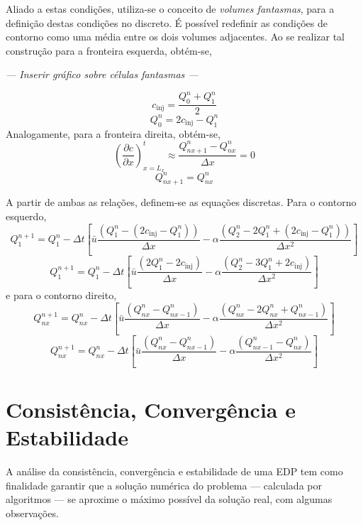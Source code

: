 Aliado a estas condições, utiliza-se o conceito de \emph{volumes fantasmas},
para a definição destas condições no discreto. É possível redefinir as
condições de contorno como uma média entre os dois volumes adjacentes. Ao se
realizar tal construção para a fronteira esquerda, obtém-se,
\begin{center}
    \textit{--- Inserir gráfico sobre células fantasmas ---}
\end{center}
\[
    c_{\text{inj}} = \frac{Q_0^n + Q_1^n}{2}
\]
\begin{equation}\label{cont. esq}
    Q_0^n = 2c_{\text{inj}} - Q_1^n
\end{equation}
Analogamente, para a fronteira direita, obtém-se,
\[
  \left(\frac{\partial c}{\partial x}\right)_{x=L_x}^t
  \approx
  \frac{Q_{nx+1}^n - Q_{nx}^n}{\Delta x} = 0
\]
\begin{equation}\label{cont. dir}
    Q_{nx+1}^n = Q_{nx}^n
\end{equation}

A partir de ambas as relações, definem-se as equações discretas. Para o contorno
esquerdo,
\[
    Q_1^{n+1} = Q_1^n - \Delta t
    \left[
    \bar{u}\frac{(Q_1^n - (2c_{\text{inj}} - Q_1^n))}{\Delta x}
    -
    \alpha\frac{(Q_2^n - 2Q_1^n + (2c_{\text{inj}} - Q_1^n))}{\Delta x^2}
    \right]
\]
\begin{equation}
    Q_1^{n+1} = Q_1^n - \Delta t
    \left[
    \bar{u}\frac{(2Q_1^n - 2c_{\text{inj}})}{\Delta x}
    -
    \alpha\frac{(Q_2^n - 3Q_1^n + 2c_{\text{inj}})}{\Delta x^2}
    \right]
\end{equation}
e para o contorno direito,
\[
    Q_{nx}^{n+1} = Q_{nx}^n - \Delta t
    \left[
    \bar{u}\frac{(Q_{nx}^n - Q_{nx-1}^n)}{\Delta x}
    -
    \alpha\frac{(Q_{nx}^n - 2Q_{nx}^n + Q_{nx-1}^n)}{\Delta x^2}
    \right]
\]
\begin{equation}
    Q_{nx}^{n+1} = Q_{nx}^n - \Delta t
    \left[
    \bar{u}\frac{(Q_{nx}^n - Q_{nx-1}^n)}{\Delta x}
    -
    \alpha\frac{(Q_{nx-1}^n - Q_{nx}^n)}{\Delta x^2}
    \right]
\end{equation}

\section{Consistência, Convergência e Estabilidade}
A análise da consistência, convergência e estabilidade de uma EDP tem como
finalidade garantir que a solução numérica do problema --- calculada por
algoritmos --- se aproxime o máximo possível da solução real, com algumas
observações.

